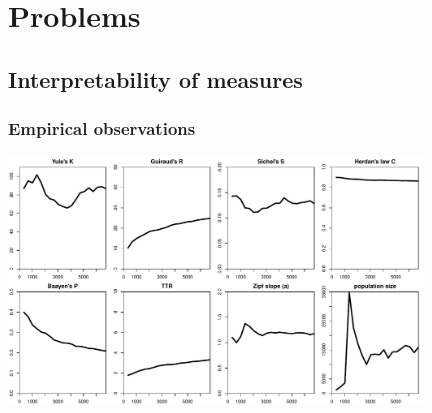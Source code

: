 \documentclass[t]{beamer} %
\begin{document}

\begin{frame}[c]
  \begin{center}
  \end{center}
\end{frame}
\hideLogo{}


\section{Problems}

\subsection{Interpretability of measures}

\begin{frame}[c]
  \frametitle{Empirical observations}

  \centering
  \includegraphics[width=11cm]{img/bare_bncS_obs_lexical_constants}
\end{frame}
\end{document}
